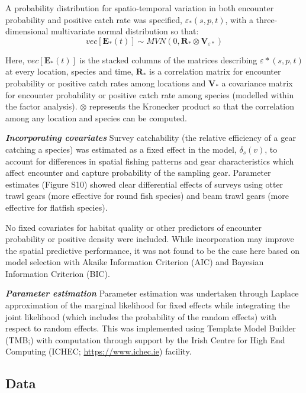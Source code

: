 \documentclass{nature}
\begin{document}
A probability distribution for spatio-temporal variation in both encounter
probability and positive catch rate was specified, $\varepsilon_{*}(s,p,t)$,
with a three-dimensional multivariate normal distribution so that:
	\begin{equation}
		vec[\mathbf{E}_{*}(t)] \sim MVN(0,\mathbf{R}_{*} \otimes
		\mathbf{V}_{{\varepsilon}{*}})
	\end{equation}

Here, $vec[\mathbf{E}_{*}(t)]$ is the stacked columns of the matrices
describing $\varepsilon{*}(s,p,t)$ at every location, species and time,
$\mathbf{R}_{*}$ is a correlation matrix for encounter probability or positive
catch rates among locations and $\mathbf{V}_{*}$ a covariance matrix for
encounter probability or positive catch rate among species (modelled within the
factor analysis). $\otimes$ represents the Kronecker product so that the
correlation among any location and species can be computed\cite{Thorson2017}.
		
\textbf{\textit{Incorporating covariates}} Survey catchability (the relative
efficiency of a gear catching a species) was estimated as a fixed effect in the
model, $\delta_{s}(v)$, to account for differences in spatial fishing patterns
and gear characteristics which affect encounter and capture probability of the
sampling gear\cite{Thorson2014}. Parameter estimates (Figure S10) showed clear
differential effects of surveys using otter trawl gears (more effective for
round fish species) and beam trawl gears (more effective for flatfish species).

No fixed covariates for habitat quality or other predictors of encounter
probability or positive density were included. While incorporation may improve
the spatial predictive performance\cite{Thorson2017}, it was not found to be
the case here based on model selection with Akaike Information Criterion (AIC)
and Bayesian Information Criterion (BIC).

\textbf{\textit{Parameter estimation}} Parameter estimation was undertaken
through Laplace approximation of the marginal likelihood for fixed effects
while integrating the joint likelihood (which includes the probability of the
random effects) with respect to random effects. This was implemented using
Template Model Builder (TMB;\cite{Kristensen2015}) with computation through
support by the Irish Centre for High End Computing (ICHEC;
\url{https://www.ichec.ie}) facility.  

\subsection{Data}
\end{document}
